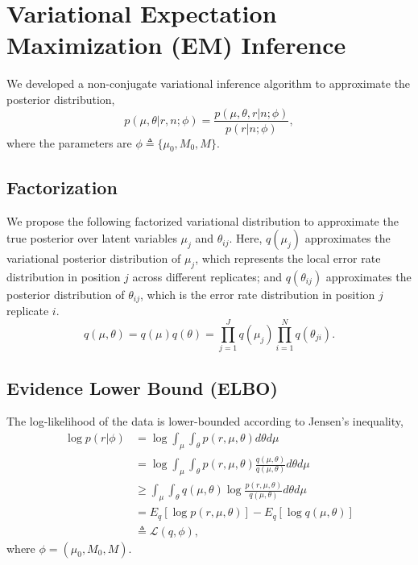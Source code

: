 \documentclass[11pt,reqno]{amsart}
\begin{document}
\section{Variational Expectation Maximization (EM) Inference}
We developed a non-conjugate variational inference algorithm to approximate the posterior distribution,
\begin{equation}
	p(\mu, \theta | r, n; \phi)  = \frac{ p(\mu, \theta, r | n; \phi) } {p ( r | n; \phi)},
\end{equation}
where the parameters are $\phi \triangleq \{\mu_0, M_0, M\}$.
\subsection{Factorization}
We propose the following factorized variational distribution to approximate the true posterior over latent variables $\mu_j$ and $\theta_{ij}$.
Here, $q(\mu_j)$ approximates the variational posterior distribution of $\mu_j$, which represents the local error rate distribution in position $j$ across different replicates;
and $q(\theta_{ij})$ approximates the posterior distribution of $\theta_{ij}$, which is the error rate distribution in position $j$ replicate $i$.
\begin{equation}
  q(\mu, \theta) = q(\mu)q(\theta) = \prod_{j=1}^J q(\mu_{j}) \prod_{i=1}^N q(\theta_{ji}).
  \label{eq:vardist}
\end{equation}
\subsection{Evidence Lower Bound (ELBO)}
The log-likelihood of the data is lower-bounded according to Jensen's inequality,
\begin{equation}
\begin{split}
\log p \left( r | \phi \right) &= \log \int_\mu \int_\theta p\left(r,\mu,\theta \right) d\theta d\mu \\
&= \log \int_\mu \int_\theta p\left(r,\mu,\theta \right)\frac{q\left(\mu,\theta \right) }{q\left(\mu,\theta \right) } d\theta d\mu \\
&\geq \int_\mu \int_\theta q\left(\mu,\theta \right) \log \frac{ p\left(r,\mu,\theta \right)}{q\left(\mu,\theta \right)} d\theta d\mu \\
&= E_q \left[ \log p\left(r,\mu,\theta \right)\right] - E_q \left[ \log q\left(\mu,\theta \right)\right] \\
&\triangleq \mathcal{L}(q, \phi),
\end{split}
\end{equation}
where $ \phi= \left( \mu_0, M_0, M \right) $.
\end{document}
